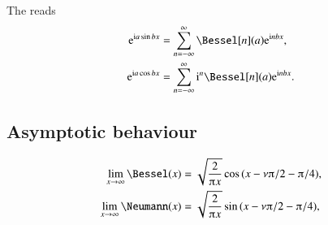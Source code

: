     The  reads
    \begin{subequations}
        \begin{align}
            \eu[\im a \sin{bx}]  &= \sum_{n=-\infty}^{\infty} \Bessel[n](a) \eu[\im n bx], \\
            \eu[\im a \cos{bx}]  &= \sum_{n=-\infty}^{\infty} \im^{n}\Bessel[n](a) \eu[\im n bx].
        \end{align}
    \end{subequations}
    


\subsection{Asymptotic behaviour}

    \begin{subequations}\label{eq:cylinder:prop:JacobiAnger}
        \begin{align}
            \lim_{x\to \infty} \Bessel(x) &=
            \sqrt{\frac{2}{\ppi x}} \cos{(x - \nu \ppi/2 - \ppi/4)}, \label{eq:cylinder:prop:JacobiAnger_sin}  \\
            \lim_{x\to \infty} \Neumann(x) &=
            \sqrt{\frac{2}{\ppi x}} \sin{(x - \nu \ppi/2 - \ppi/4)},\label{eq:cylinder:prop:JacobiAnger_cos} 
        \end{align}
    \end{subequations}


